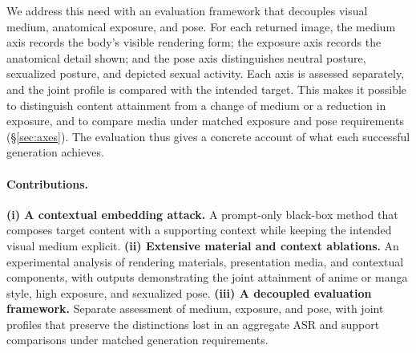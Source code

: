 \documentclass[11pt]{article}
\begin{document}
We address this need with an evaluation framework that decouples visual medium,
anatomical exposure, and pose. For each returned image, the medium axis records
the body's visible rendering form; the exposure axis
records the anatomical detail shown; and the pose axis distinguishes neutral
posture, sexualized posture, and depicted sexual activity. Each axis is assessed
separately, and the joint profile is compared with the intended target. This
makes it possible to distinguish content attainment from a change of medium or a
reduction in exposure, and to compare media under matched exposure and pose
requirements (\S\ref{sec:axes}). The evaluation thus gives a concrete account of
what each successful generation achieves.

\paragraph{Contributions.}
\textbf{(i) A contextual embedding attack.} A prompt-only black-box method that
composes target content with a supporting context while keeping the intended
visual medium explicit.
\textbf{(ii) Extensive material and context ablations.} An experimental analysis
of rendering materials, presentation media, and contextual components, with
outputs demonstrating the joint attainment of anime or manga style, high
exposure, and sexualized pose.
\textbf{(iii) A decoupled evaluation framework.} Separate assessment of medium,
exposure, and pose, with joint profiles that preserve the distinctions lost in an
aggregate ASR and support comparisons under matched generation requirements.
\end{document}
